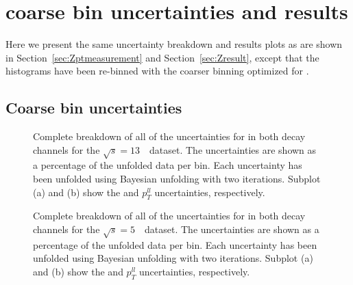 \section{\ptz coarse bin uncertainties and results}
\label{sec:zpt_coarse_bin}

Here we present the same \ptdilep uncertainty breakdown and results plots as are shown in Section~\ref{sec:Zptmeasurement} and Section~\ref{sec:Zresult}, except that the histograms have been re-binned with the coarser binning optimized for \ut.

\subsection{Coarse bin uncertainties}

\begin{figure}[h]
\centering
{}
\caption{Complete breakdown of all of the uncertainties for \ptdilep in both \Zboson decay channels for the $\sqrt{s} = 13$~\TeV\ dataset. The uncertainties are shown as a percentage of the unfolded data per \pT bin. Each uncertainty has been unfolded using Bayesian unfolding with two iterations. Subplot (a) and (b) show the \Zee and \Zmm $p_{T}^{ll}$ uncertainties, respectively.}\end{figure}


\begin{figure}[h]
\centering
{}
\caption{Complete breakdown of all of the uncertainties for \ptdilep in both \Zboson decay channels for the $\sqrt{s} = 5$~\TeV\ dataset. The uncertainties are shown as a percentage of the unfolded data per \pT bin. Each uncertainty has been unfolded using Bayesian unfolding with two iterations. Subplot (a) and (b) show the \Zee and \Zmm $p_{T}^{ll}$ uncertainties, respectively.}\end{figure}


